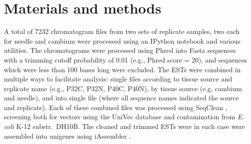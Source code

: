 \documentclass[11pt]{article}
\begin{document}







\section*{Materials and methods}\label{ss:mats}
A total of 7232 chromatogram files from two sets of replicate
samples, two each for needle and cambium were processed using an
IPython \citep[v 2.1]{per-gra:2007} notebook and various utilities.
The chromatograms were processed using Phred \citep[v.\
020425]{ewing1998b} into Fasta sequences with a trimming cutoff
probability of 0.01 (e.g., Phred score = 20), and sequences which were
less than 100 bases long were excluded.  The ESTs were combined in
multiple ways to facilitate analysis: single files according to tissue
source and replicate name (e.g., P32C, P32N, P40C, P40N), by tissue
source (e.g, cambium and needle), and into single file (where all
sequence names indicated the source and replicate).  Each of these
combined files was processed using SeqClean \citep[v.\ 2/2011][default
parameters]{citeulike:1911083}, screening both for vectors using the
UniVec \citep{cochrane01012010} database and contamination from
\textit{E. coli} K-12 substr.\ DH10B.  The cleaned and trimmed ESTs
were in each case were assembled into unigenes using iAssembler
\citep[v.\ 1.3.2][default parameters]{zheng2011iassembler}.
\end{document}

